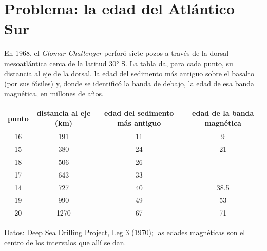 \section{Problema: la edad del Atlántico Sur}

\begin{problem}
\label{pb:g11:drift-to-spreading:1}
En 1968, el \emph{Glomar Challenger} perforó siete pozos a través de la
dorsal mesoatlántica cerca de la latitud \ang{30} S. La tabla da, para cada
punto, su distancia al eje de la dorsal, la edad del sedimento más antiguo
sobre el basalto (por sus fósiles) y, donde se identificó la banda de debajo,
la edad de esa banda magnética, en millones de años.

\begin{center}
\small
\begin{tabular}{|c|c|c|c|}
\hline
punto & distancia al eje (\unit{km}) & edad del sedimento más antiguo & edad de la banda magnética \\ \hline
16 & 191 & 11 & 9 \\ \hline
15 & 380 & 24 & 21 \\ \hline
18 & 506 & 26 & --- \\ \hline
17 & 643 & 33 & --- \\ \hline
14 & 727 & 40 & 38.5 \\ \hline
19 & 990 & 49 & 53 \\ \hline
20 & 1270 & 67 & 71 \\ \hline
\end{tabular}

{\small Datos: Deep Sea Drilling Project, Leg 3 (1970); las edades magnéticas
son el centro de los intervalos que allí se dan.}
\end{center}

\begin{center}


\end{center}
\end{problem}
